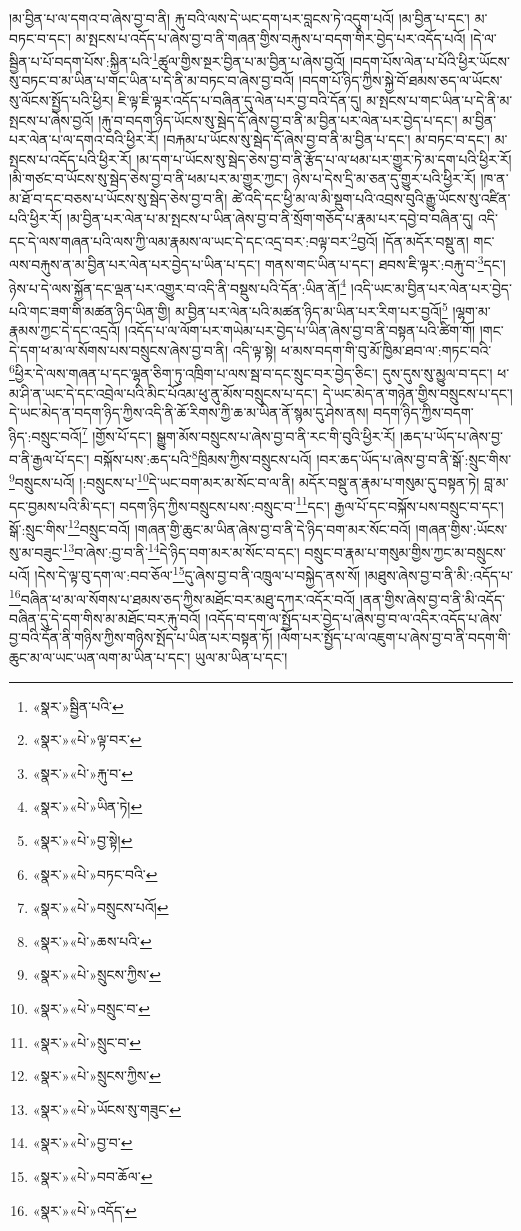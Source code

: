 །མ་བྱིན་པ་ལ་དགའ་བ་ཞེས་བྱ་བ་ནི། རྐུ་བའི་ལས་དེ་ཡང་དག་པར་བླངས་ཏེ་འདུག་པའོ། །མ་བྱིན་པ་དང་། མ་བཏང་བ་དང་། མ་སྤངས་པ་འདོད་པ་ཞེས་བྱ་བ་ནི་གཞན་གྱིས་བརྐུས་པ་བདག་གིར་བྱེད་པར་འདོད་པའོ། །དེ་ལ་སྦྱིན་པ་པོ་བདག་པོས་:སྐྱིན་པའི་\footnote{«སྣར་»སྦྱིན་པའི་}ཚུལ་གྱིས་སྔར་བྱིན་པ་མ་བྱིན་པ་ཞེས་བྱའོ། །བདག་པོས་ལེན་པ་པོའི་ཕྱིར་ཡོངས་སུ་བཏང་བ་མ་ཡིན་པ་གང་ཡིན་པ་དེ་ནི་མ་བཏང་བ་ཞེས་བྱ་བའོ། །བདག་པོ་ཉིད་ཀྱིས་སྐྱེ་བོ་ཐམས་ཅད་ལ་ཡོངས་སུ་ལོངས་སྤྱོད་པའི་ཕྱིར། ཇི་ལྟ་ཇི་ལྟར་འདོད་པ་བཞིན་དུ་ལེན་པར་བྱ་བའི་དོན་དུ། མ་སྤངས་པ་གང་ཡིན་པ་དེ་ནི་མ་སྤངས་པ་ཞེས་བྱའོ། །རྐུ་བ་བདག་ཉིད་ཡོངས་སུ་སྦེད་དོ་ཞེས་བྱ་བ་ནི་མ་བྱིན་པར་ལེན་པར་བྱེད་པ་དང་། མ་བྱིན་པར་ལེན་པ་ལ་དགའ་བའི་ཕྱིར་རོ། །བརྐམ་པ་ཡོངས་སུ་སྦེད་དོ་ཞེས་བྱ་བ་ནི་མ་བྱིན་པ་དང་། མ་བཏང་བ་དང་། མ་སྤངས་པ་འདོད་པའི་ཕྱིར་རོ། །མ་དག་པ་ཡོངས་སུ་སྦེད་ཅེས་བྱ་བ་ནི་རྩོད་པ་ལ་ཕམ་པར་གྱུར་ཏེ་མ་དག་པའི་ཕྱིར་རོ། །མི་གཙང་བ་ཡོངས་སུ་སྦེད་ཅེས་བྱ་བ་ནི་ཕམ་པར་མ་གྱུར་ཀྱང་། ཉེས་པ་དེས་དྲི་མ་ཅན་དུ་གྱུར་པའི་ཕྱིར་རོ། །ཁ་ན་མ་ཐོ་བ་དང་བཅས་པ་ཡོངས་སུ་སྦེད་ཅེས་བྱ་བ་ནི། ཚེ་འདི་དང་ཕྱི་མ་ལ་མི་སྡུག་པའི་འབྲས་བུའི་རྒྱུ་ཡོངས་སུ་འཛིན་པའི་ཕྱིར་རོ། །མ་བྱིན་པར་ལེན་པ་མ་སྤངས་པ་ཡིན་ཞེས་བྱ་བ་ནི་སྲོག་གཅོད་པ་རྣམ་པར་དབྱེ་བ་བཞིན་དུ། འདི་དང་དེ་ལས་གཞན་པའི་ལས་ཀྱི་ལམ་རྣམས་ལ་ཡང་དེ་དང་འདྲ་བར་:བལྟ་བར་\footnote{«སྣར་»«པེ་»ལྟ་བར་}བྱའོ། །དོན་མདོར་བསྡུ་ན། གང་ལས་བརྐུས་ན་མ་བྱིན་པར་ལེན་པར་བྱེད་པ་ཡིན་པ་དང་། གནས་གང་ཡིན་པ་དང་། ཐབས་ཇི་ལྟར་:བརྐུ་བ་\footnote{«སྣར་»«པེ་»རྐུ་བ་}དང་། ཉེས་པ་དེ་ལས་སྐྱོན་དང་ལྡན་པར་འགྱུར་བ་འདི་ནི་བསྡུས་པའི་དོན་:ཡིན་ནོ།\footnote{«སྣར་»«པེ་»ཡིན་ཏེ།} །འདི་ཡང་མ་བྱིན་པར་ལེན་པར་བྱེད་པའི་གང་ཟག་གི་མཚན་ཉིད་ཡིན་གྱི། མ་བྱིན་པར་ལེན་པའི་མཚན་ཉིད་མ་ཡིན་པར་རིག་པར་བྱའོ།\footnote{«སྣར་»«པེ་»བྱ་སྟེ།} །ལྷག་མ་རྣམས་ཀྱང་དེ་དང་འདྲའོ། །འདོད་པ་ལ་ལོག་པར་གཡེམ་པར་བྱེད་པ་ཡིན་ཞེས་བྱ་བ་ནི་བསྟན་པའི་ཚིག་གོ། །གང་དེ་དག་ཕ་མ་ལ་སོགས་པས་བསྲུངས་ཞེས་བྱ་བ་ནི། འདི་ལྟ་སྟེ། ཕ་མས་བདག་གི་བུ་མོ་ཁྱིམ་ཐབ་ལ་:གཏང་བའི་\footnote{«སྣར་»«པེ་»བཏང་བའི་}ཕྱིར་དེ་ལས་གཞན་པ་དང་ལྷན་ཅིག་ཏུ་འཁྲིག་པ་ལས་སྦ་བ་དང་སྲུང་བར་བྱེད་ཅིང་། དུས་དུས་སུ་མྱུལ་བ་དང་། ཕ་མ་ཤི་ན་ཡང་དེ་དང་འབྲེལ་པའི་མིང་པོའམ་ཕུ་ནུ་མོས་བསྲུངས་པ་དང་། དེ་ཡང་མེད་ན་གཉེན་གྱིས་བསྲུངས་པ་དང་། དེ་ཡང་མེད་ན་བདག་ཉིད་ཀྱིས་འདི་ནི་ཆོ་རིགས་ཀྱི་ཆ་མ་ཡིན་ནོ་སྙམ་དུ་ཤེས་ནས། བདག་ཉིད་ཀྱིས་བདག་ཉིད་:བསྲུང་བའོ།\footnote{«སྣར་»«པེ་»བསྲུངས་པའོ།} །གྱོས་པོ་དང་། སྒྱུག་མོས་བསྲུངས་པ་ཞེས་བྱ་བ་ནི་རང་གི་བུའི་ཕྱིར་རོ། །ཆད་པ་ཡོད་པ་ཞེས་བྱ་བ་ནི་རྒྱལ་པོ་དང་། བསྐོས་པས་:ཆད་པའི་\footnote{«སྣར་»«པེ་»ཆས་པའི་}ཁྲིམས་ཀྱིས་བསྲུངས་པའོ། །བར་ཆད་ཡོད་པ་ཞེས་བྱ་བ་ནི་སྒོ་:སྲུང་གིས་\footnote{«སྣར་»«པེ་»སྲུངས་ཀྱིས་}བསྲུངས་པའོ། །:བསྲུངས་པ་\footnote{«སྣར་»«པེ་»བསྲུང་བ་}དེ་ཡང་བག་མར་མ་སོང་བ་ལ་ནི། མདོར་བསྡུ་ན་རྣམ་པ་གསུམ་དུ་བསྟན་ཏེ། བླ་མ་དང་བྱམས་པའི་མི་དང་། བདག་ཉིད་ཀྱིས་བསྲུངས་པས་:བསྲུང་བ་\footnote{«སྣར་»«པེ་»སྲུང་བ་}དང་། རྒྱལ་པོ་དང་བསྐོས་པས་བསྲུང་བ་དང་། སྒོ་:སྲུང་གིས་\footnote{«སྣར་»«པེ་»སྲུངས་ཀྱིས་}བསྲུང་བའོ། །གཞན་གྱི་ཆུང་མ་ཡིན་ཞེས་བྱ་བ་ནི་དེ་ཉིད་བག་མར་སོང་བའོ། །གཞན་གྱིས་:ཡོངས་སུ་མ་བཟུང་\footnote{«སྣར་»«པེ་»ཡོངས་སུ་གཟུང་}བ་ཞེས་:བྱ་བ་ནི་\footnote{«སྣར་»«པེ་»བྱ་བ་}དེ་ཉིད་བག་མར་མ་སོང་བ་དང་། བསྲུང་བ་རྣམ་པ་གསུམ་གྱིས་ཀྱང་མ་བསྲུངས་པའོ། །དེས་དེ་ལྟ་བུ་དག་ལ་:བབ་ཅོལ་\footnote{«སྣར་»«པེ་»བབ་ཆོལ་}དུ་ཞེས་བྱ་བ་ནི་འཁྲུལ་པ་བསྐྱེད་ནས་སོ། །མཐུས་ཞེས་བྱ་བ་ནི་མི་:འདོད་པ་\footnote{«སྣར་»«པེ་»འདོད་}བཞིན་ཕ་མ་ལ་སོགས་པ་ཐམས་ཅད་ཀྱིས་མཐོང་བར་མཐུ་དཀར་འདོར་བའོ། །ནན་གྱིས་ཞེས་བྱ་བ་ནི་མི་འདོད་བཞིན་དུ་དེ་དག་གིས་མ་མཐོང་བར་རྐུ་བའོ། །འདོད་བ་དག་ལ་སྤྱོད་པར་བྱེད་པ་ཞེས་བྱ་བ་ལ་འདིར་འདོད་པ་ཞེས་བྱ་བའི་དོན་ནི་གཉིས་ཀྱིས་གཉིས་སྤོད་པ་ཡིན་པར་བསྟན་ཏོ། །ལོག་པར་སྤྱོད་པ་ལ་འཇུག་པ་ཞེས་བྱ་བ་ནི་བདག་གི་ཆུང་མ་ལ་ཡང་ཡན་ལག་མ་ཡིན་པ་དང་། ཡུལ་མ་ཡིན་པ་དང་། 